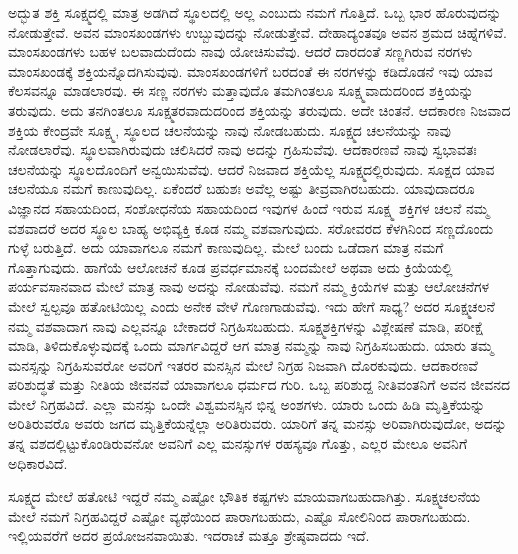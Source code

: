 ಅದ್ಭುತ ಶಕ್ತಿ ಸೂಕ್ಷ್ಮದಲ್ಲಿ ಮಾತ್ರ ಅಡಗಿದೆ ಸ್ಥೂಲದಲ್ಲಿ ಅಲ್ಲ ಎಂಬುದು ನಮಗೆ ಗೊತ್ತಿದೆ. ಒಬ್ಬ ಭಾರ ಹೊರುವುದನ್ನು ನೋಡುತ್ತೇವೆ. ಅವನ ಮಾಂಸಖಂಡಗಳು ಉಬ್ಬುವುದನ್ನು ನೋಡುತ್ತೇವೆ. ದೇಹಾದ್ಯಂತವೂ ಅವನ ಶ್ರಮದ ಚಿಹ್ನೆಗಳಿವೆ. ಮಾಂಸಖಂಡಗಳು ಬಹಳ ಬಲವಾದುದೆಂದು ನಾವು ಯೋಚಿಸುವೆವು. ಆದರೆ ದಾರದಂತೆ ಸಣ್ಣಗಿರುವ ನರಗಳು ಮಾಂಸಖಂಡಕ್ಕೆ ಶಕ್ತಿಯನ್ನೊದಗಿಸುವುವು. ಮಾಂಸಖಂಡಗಳಿಗೆ ಬರದಂತೆ ಈ ನರಗಳನ್ನು ಕಡಿದೊಡನೆ ಇವು ಯಾವ ಕೆಲಸವನ್ನೂ ಮಾಡಲಾರವು. ಈ ಸಣ್ಣ ನರಗಳು ಮತ್ತಾವುದೊ ತಮಗಿಂತಲೂ ಸೂಕ್ಷ್ಮವಾದುದರಿಂದ ಶಕ್ತಿಯನ್ನು ತರುವುದು. ಅದು ತನಗಿಂತಲೂ ಸೂಕ್ಷ್ಮತರವಾದುದರಿಂದ ಶಕ್ತಿಯನ್ನು ತರುವುದು. ಅದೇ ಚಿಂತನೆ. ಆದಕಾರಣ ನಿಜವಾದ ಶಕ್ತಿಯ ಕೇಂದ್ರವೇ ಸೂಕ್ಷ್ಮ, ಸ್ಥೂಲದ ಚಲನೆಯನ್ನು ನಾವು ನೋಡಬಹುದು. ಸೂಕ್ಷ್ಮದ ಚಲನೆಯನ್ನು ನಾವು ನೋಡಲಾರೆವು. ಸ್ಥೂಲವಾಗಿರುವುದು ಚಲಿಸಿದರೆ ನಾವು ಅದನ್ನು ಗ್ರಹಿಸುವೆವು. ಆದಕಾರಣವೆ ನಾವು ಸ್ವಭಾವತಃ ಚಲನೆಯನ್ನು ಸ್ಥೂಲದೊಂದಿಗೆ ಅನ್ವಯಿಸುವೆವು. ಆದರೆ ನಿಜವಾದ ಶಕ್ತಿಯೆಲ್ಲ ಸೂಕ್ಷ್ಮದಲ್ಲಿರುವುದು. ಸೂಕ್ಷದ ಯಾವ ಚಲನೆಯೂ ನಮಗೆ ಕಾಣುವುದಿಲ್ಲ. ಏಕೆಂದರೆ ಬಹುಶಃ ಅವೆಲ್ಲ ಅಷ್ಟು ತೀವ್ರವಾಗಿರಬಹುದು. ಯಾವುದಾದರೂ ವಿಜ್ಞಾನದ ಸಹಾಯದಿಂದ, ಸಂಶೋಧನೆಯ ಸಹಾಯದಿಂದ ಇವುಗಳ ಹಿಂದೆ ಇರುವ ಸೂಕ್ಷ್ಮ ಶಕ್ತಿಗಳ ಚಲನೆ ನಮ್ಮ ವಶವಾದರೆ ಅದರ ಸ್ಥೂಲ ಬಾಹ್ಯ ಅಭಿವ್ಯಕ್ತಿ ಕೂಡ ನಮ್ಮ ವಶವಾಗುವುದು. ಸರೋವರದ ಕೆಳಗಿನಿಂದ ಸಣ್ಣದೊಂದು ಗುಳ್ಳೆ ಬರುತ್ತಿದೆ. ಅದು ಯಾವಾಗಲೂ ನಮಗೆ ಕಾಣುವುದಿಲ್ಲ. ಮೇಲೆ ಬಂದು ಒಡೆದಾಗ ಮಾತ್ರ ನಮಗೆ ಗೊತ್ತಾಗುವುದು. ಹಾಗೆಯೆ ಆಲೋಚನೆ ಕೂಡ ಪ್ರವರ್ಧಮಾನಕ್ಕೆ ಬಂದಮೇಲೆ ಅಥವಾ ಅದು ಕ್ರಿಯೆಯಲ್ಲಿ ಪರ್ಯವಸಾನವಾದ ಮೇಲೆ ಮಾತ್ರ ನಾವು ಅದನ್ನು ನೋಡುವೆವು. ನಮಗೆ ನಮ್ಮ ಕ್ರಿಯೆಗಳ ಮತ್ತು ಆಲೋಚನೆಗಳ ಮೇಲೆ ಸ್ವಲ್ಪವೂ ಹತೋಟಿಯಿಲ್ಲ ಎಂದು ಅನೇಕ ವೇಳೆ ಗೊಣಗಾಡುವೆವು. ಇದು ಹೇಗೆ ಸಾಧ್ಯ? ಅದರ ಸೂಕ್ಷ್ಮಚಲನೆ ನಮ್ಮ ವಶವಾದಾಗ ನಾವು ಎಲ್ಲವನ್ನೂ ಬೇಕಾದರೆ ನಿಗ್ರಹಿಸಬಹುದು. ಸೂಕ್ಷ್ಮಶಕ್ತಿಗಳನ್ನು ವಿಶ್ಲೇಷಣೆ ಮಾಡಿ, ಪರೀಕ್ಷೆ ಮಾಡಿ, ತಿಳಿದುಕೊಳ್ಳುವುದಕ್ಕೆ ಒಂದು ಮಾರ್ಗವಿದ್ದರೆ ಆಗ ಮಾತ್ರ ನಮ್ಮನ್ನು ನಾವು ನಿಗ್ರಹಿಸಬಹುದು. ಯಾರು ತಮ್ಮ ಮನಸ್ಸನ್ನು ನಿಗ್ರಹಿಸುವರೋ ಅವರಿಗೆ ಇತರರ ಮನಸ್ಸಿನ ಮೇಲೆ ನಿಗ್ರಹ ನಿಜವಾಗಿ ದೊರಕುವುದು. ಆದಕಾರಣವೆ ಪರಿಶುದ್ಧತೆ ಮತ್ತು ನೀತಿಯ ಜೀವನವೆ ಯಾವಾಗಲೂ ಧರ್ಮದ ಗುರಿ. ಒಬ್ಬ ಪರಿಶುದ್ದ ನೀತಿವಂತನಿಗೆ ಅವನ ಜೀವನದ ಮೇಲೆ ನಿಗ್ರಹವಿದೆ. ಎಲ್ಲಾ ಮನಸ್ಸು ಒಂದೇ ವಿಶ್ವಮನಸ್ಸಿನ ಭಿನ್ನ ಅಂಶಗಳು. ಯಾರು ಒಂದು ಹಿಡಿ ಮೃತ್ತಿಕೆಯನ್ನು ಅರಿತಿರುವರೊ ಅವರು ಜಗದ ಮೃತ್ತಿಕೆಯನ್ನೆಲ್ಲಾ ಅರಿತಿರುವರು. ಯಾರಿಗೆ ತನ್ನ ಮನಸ್ಸು ಅರಿವಾಗಿರುವುದೋ, ಅದನ್ನು ತನ್ನ ವಶದಲ್ಲಿಟ್ಟುಕೊಂಡಿರುವನೋ ಅವನಿಗೆ ಎಲ್ಲ ಮನಸ್ಸುಗಳ ರಹಸ್ಯವೂ ಗೊತ್ತು, ಎಲ್ಲರ ಮೇಲೂ ಅವನಿಗೆ ಅಧಿಕಾರವಿದೆ.

ಸೂಕ್ಷ್ಮದ ಮೇಲೆ ಹತೋಟಿ ಇದ್ದರೆ ನಮ್ಮ ಎಷ್ಟೋ ಭೌತಿಕ ಕಷ್ಟಗಳು ಮಾಯವಾಗಬಹುದಾಗಿತ್ತು. ಸೂಕ್ಷ್ಮಚಲನೆಯ ಮೇಲೆ ನಮಗೆ ನಿಗ್ರಹವಿದ್ದರೆ ಎಷ್ಟೋ ವ್ಯಥೆಯಿಂದ ಪಾರಾಗಬಹುದು, ಎಷ್ಟೊ ಸೋಲಿನಿಂದ ಪಾರಾಗಬಹುದು. ಇಲ್ಲಿಯವರೆಗೆ ಅದರ ಪ್ರಯೋಜನವಾಯಿತು. ಇದರಾಚೆ ಮತ್ತೂ ಶ್ರೇಷ್ಠವಾದದು ಇದೆ.

